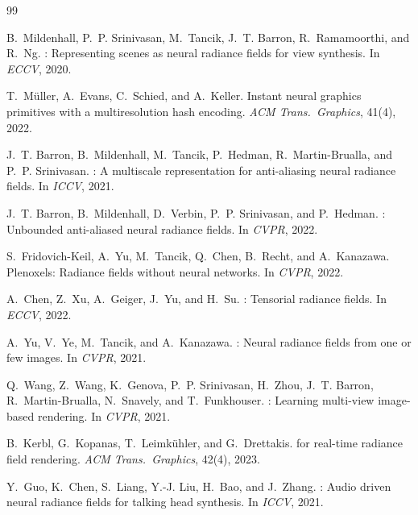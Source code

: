 \documentclass[10pt,twocolumn,letterpaper]{article}
\begin{document}
{\small

\begin{thebibliography}{99}

B.~Mildenhall, P.~P. Srinivasan, M.~Tancik, J.~T. Barron, R.~Ramamoorthi, and R.~Ng.
: Representing scenes as neural radiance fields for view synthesis.
\newblock In \emph{ECCV}, 2020.

T.~M{\"u}ller, A.~Evans, C.~Schied, and A.~Keller.
\newblock Instant neural graphics primitives with a multiresolution hash encoding.
\newblock \emph{ACM Trans.\ Graphics}, 41(4), 2022.

J.~T. Barron, B.~Mildenhall, M.~Tancik, P.~Hedman, R.~Martin-Brualla, and P.~P. Srinivasan.
: A multiscale representation for anti-aliasing neural radiance fields.
\newblock In \emph{ICCV}, 2021.

J.~T. Barron, B.~Mildenhall, D.~Verbin, P.~P. Srinivasan, and P.~Hedman.
: Unbounded anti-aliased neural radiance fields.
\newblock In \emph{CVPR}, 2022.

S.~Fridovich-Keil, A.~Yu, M.~Tancik, Q.~Chen, B.~Recht, and A.~Kanazawa.
\newblock Plenoxels: Radiance fields without neural networks.
\newblock In \emph{CVPR}, 2022.

A.~Chen, Z.~Xu, A.~Geiger, J.~Yu, and H.~Su.
: Tensorial radiance fields.
\newblock In \emph{ECCV}, 2022.

A.~Yu, V.~Ye, M.~Tancik, and A.~Kanazawa.
: Neural radiance fields from one or few images.
\newblock In \emph{CVPR}, 2021.

Q.~Wang, Z.~Wang, K.~Genova, P.~P. Srinivasan, H.~Zhou, J.~T. Barron, R.~Martin-Brualla, N.~Snavely, and T.~Funkhouser.
: Learning multi-view image-based rendering.
\newblock In \emph{CVPR}, 2021.

B.~Kerbl, G.~Kopanas, T.~Leimk{\"u}hler, and G.~Drettakis.
 for real-time radiance field rendering.
\newblock \emph{ACM Trans.\ Graphics}, 42(4), 2023.

Y.~Guo, K.~Chen, S.~Liang, Y.-J. Liu, H.~Bao, and J.~Zhang.
: Audio driven neural radiance fields for talking head synthesis.
\newblock In \emph{ICCV}, 2021.


\end{thebibliography}}
\end{document}
